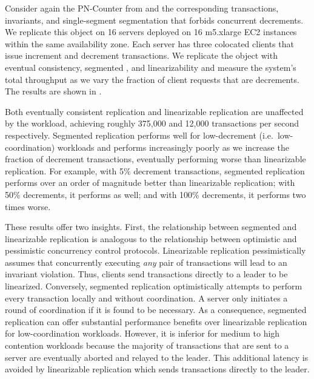 \begin{benchmark}
  Consider again the PN-Counter from  and the
  corresponding transactions, invariants, and single-segment segmentation that
  forbids concurrent decrements. We replicate this object on 16 servers
  deployed on 16 m5.xlarge EC2 instances within the same availability zone.
  Each server has three colocated clients that issue increment and decrement
  transactions. We replicate the object with eventual consistency, segmented
  \invariantconfluence{}, and linearizability and measure the system's total
  throughput as we vary the fraction of client requests that are decrements.
  The results are shown in .

  Both eventually consistent replication and linearizable replication are
  unaffected by the workload, achieving roughly 375,000 and 12,000 transactions
  per second respectively. Segmented \invariantconfluent{} replication performs
  well for low-decrement (i.e.\ low-coordination) workloads and performs
  increasingly poorly as we increase the fraction of decrement transactions,
  eventually performing worse than linearizable replication. For example, with
  5\% decrement transactions, segmented \invariantconfluent{} replication
  performs over an order of magnitude better than linearizable replication;
  with 50\% decrements, it performs as well; and with 100\% decrements, it
  performs two times worse.


  These results offer two insights.
  First, the relationship between segmented \invariantconfluent{} and
  linearizable replication is analogous to the relationship between optimistic
  and pessimistic concurrency control protocols. Linearizable replication pessimistically assumes that
  concurrently executing \emph{any} pair of transactions will lead to an
  invariant violation. Thus, clients send transactions directly to a leader to
  be linearized. Conversely, segmented \invariantconfluent{} replication
  optimistically attempts to perform every transaction locally and without
  coordination. A server only initiates a round of coordination if it is found
  to be necessary. As a consequence, segmented \invariantconfluent{}
  replication can offer substantial performance benefits over linearizable
  replication for low-coordination workloads. However, it is inferior for
  medium to high contention workloads because the majority of transactions that
  are sent to a server are eventually aborted and relayed to the leader. This
  additional latency is avoided by linearizable replication which sends
  transactions directly to the leader.


\end{benchmark}
